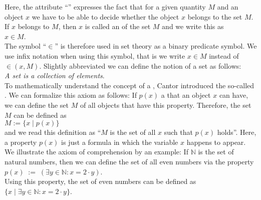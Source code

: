 \noindent
Here, the attribute ``'' expresses the fact that for a given quantity $M$ and an object $x$ we have
to be able to decide whether the object $x$ belongs to the set $M$.  If $x$ belongs to $M$, then $x$ is called an
 of the set $M$ and we write this as
\\[0.2cm]
\hspace*{1.3cm}
$x \in M$. 
\\[0.2cm]
The symbol ``$\in$'' is therefore used in set theory as a binary predicate symbol.  We use infix notation when
using this symbol, that is we write $x \in M$ instead of ${\in}(x, M)$.  
Slightly abbreviated we can define the notion of a set as follows: 
\\[0.2cm]
\hspace*{1.3cm}
\textsl{A set is a  collection of elements}.
\\[0.2cm]
To mathematically understand the concept of a ,
Cantor introduced the so-called .
We can formalize this axiom as follows:  If $p(x)$ a  that
an object $x$ can have, we can define the set $M$ of all objects that have this
property.  Therefore, the set $M$ can be defined as 
\\[0.2cm]
\hspace*{1.3cm} 
$M := \{ x \;|\; p(x) \}$ 
\\[0.2cm]
and we read this definition as ``$M$ is the set of all $x$ such that $p(x)$ holds''.
Here, a property $p(x)$ is just a formula in which the variable $x$ happens to appear.
We illustrate the axiom of comprehension by an example: If $\mathbb{N}$ is
the set of natural numbers, then we can define the set of all even numbers
via the property \\[0.2cm]
\hspace*{1.3cm} $p(x) \;:=\; (\exists y\in \mathbb{N}: x = 2 \cdot y)$. \\[0.2cm]
Using this property, the set of even numbers can be defined as \\[0.2cm]
\hspace*{1.3cm} $\{ x \;|\; \exists y\in \mathbb{N}: x = 2 \cdot y \}$. 

